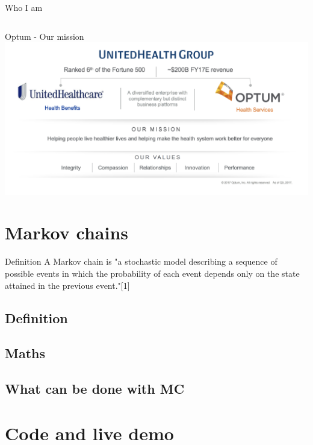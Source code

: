 \documentclass[10pt,notes]{beamer}
\begin{document}
\begin{frame}{Who I am}
\begin{columns}
		\end{columns}
	\end{frame}
	
	
	\begin{frame}{Optum - Our mission}
		\includegraphics[width=\textwidth]{imgs/optum-mission.png}
	\end{frame}
	
	
	\section{Markov chains}
	\begin{frame}
	\begin{block}{Definition}
	A Markov chain is "a stochastic model describing a sequence of possible events in which the probability of each event depends only on the state attained in the previous event."[1]
\end{block}
\end{frame}
	\subsection{Definition}
	
	\subsection{Maths}
	
	\subsection{What can be done with MC}
	
	\section{Code and live demo}
\end{document}
